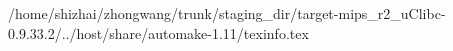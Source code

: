 /home/shizhai/zhongwang/trunk/staging_dir/target-mips_r2_uClibc-0.9.33.2/../host/share/automake-1.11/texinfo.tex